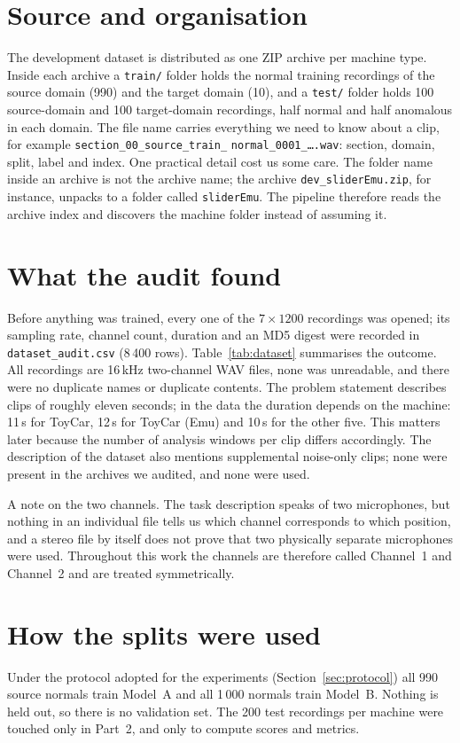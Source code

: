 \section{Source and organisation}
The development dataset \cite{dcase2026data} is distributed as one ZIP archive per machine type. Inside each archive a \texttt{train/} folder holds the normal training recordings of the source domain (990) and the target domain (10), and a \texttt{test/} folder holds 100 source-domain and 100 target-domain recordings, half normal and half anomalous in each domain. The file name carries everything we need to know about a clip, for example \texttt{section\_00\_source\_train\_} \texttt{normal\_0001\_\ldots.wav}: section, domain, split, label and index. One practical detail cost us some care. The folder name inside an archive is not the archive name; the archive \texttt{dev\_sliderEmu.zip}, for instance, unpacks to a folder called \texttt{sliderEmu}. The pipeline therefore reads the archive index and discovers the machine folder instead of assuming it.

\section{What the audit found}
Before anything was trained, every one of the $7\times1200$ recordings was opened; its sampling rate, channel count, duration and an MD5 digest were recorded in \texttt{dataset\_audit.csv} (8\,400 rows). Table~\ref{tab:dataset} summarises the outcome. All recordings are 16\,kHz two-channel WAV files, none was unreadable, and there were no duplicate names or duplicate contents. The problem statement describes clips of roughly eleven seconds; in the data the duration depends on the machine: 11\,s for ToyCar, 12\,s for ToyCar (Emu) and 10\,s for the other five. This matters later because the number of analysis windows per clip differs accordingly. The description of the dataset also mentions supplemental noise-only clips; none were present in the archives we audited, and none were used.



A note on the two channels. The task description speaks of two microphones, but nothing in an individual file tells us which channel corresponds to which position, and a stereo file by itself does not prove that two physically separate microphones were used. Throughout this work the channels are therefore called Channel~1 and Channel~2 and are treated symmetrically.

\section{How the splits were used}
Under the protocol adopted for the experiments (Section~\ref{sec:protocol}) all 990 source normals train Model~A and all 1\,000 normals train Model~B. Nothing is held out, so there is no validation set. The 200 test recordings per machine were touched only in Part~2, and only to compute scores and metrics.
